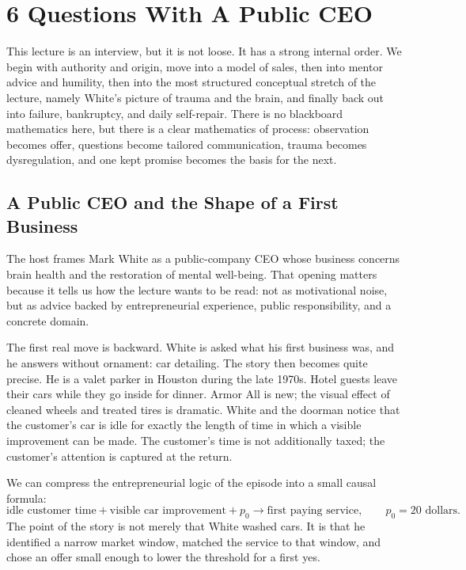 \chapter{6 Questions With A Public CEO}

This lecture is an interview, but it is not loose. It has a strong internal order. We begin with authority and origin, move into a model of sales, then into mentor advice and humility, then into the most structured conceptual stretch of the lecture, namely White's picture of trauma and the brain, and finally back out into failure, bankruptcy, and daily self-repair. There is no blackboard mathematics here, but there is a clear mathematics of process: observation becomes offer, questions become tailored communication, trauma becomes dysregulation, and one kept promise becomes the basis for the next.

\section{A Public CEO and the Shape of a First Business}

The host frames Mark White as a public-company CEO whose business concerns brain health and the restoration of mental well-being. That opening matters because it tells us how the lecture wants to be read: not as motivational noise, but as advice backed by entrepreneurial experience, public responsibility, and a concrete domain.

The first real move is backward. White is asked what his first business was, and he answers without ornament: car detailing. The story then becomes quite precise. He is a valet parker in Houston during the late 1970s. Hotel guests leave their cars while they go inside for dinner. Armor All is new; the visual effect of cleaned wheels and treated tires is dramatic. White and the doorman notice that the customer's car is idle for exactly the length of time in which a visible improvement can be made. The customer's time is not additionally taxed; the customer's attention is captured at the return.

We can compress the entrepreneurial logic of the episode into a small causal formula:
\begin{equation}
\text{idle customer time}+\text{visible car improvement}+p_0 \to \text{first paying service},
\qquad p_0=20\text{ dollars}.
\end{equation}
The point of the story is not merely that White washed cars. It is that he identified a narrow market window, matched the service to that window, and chose an offer small enough to lower the threshold for a first yes.

